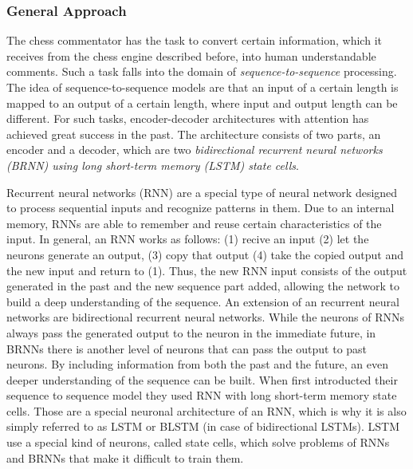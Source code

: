 \subsubsection{General Approach}

The chess commentator has the task to convert certain information, which it receives from the chess engine described before, into human understandable comments. Such a task falls into the domain of \textit{sequence-to-sequence} processing. The idea of sequence-to-sequence models are that an input of a certain length is mapped to an output of a certain length, where input and output length can be different. For such tasks, encoder-decoder architectures with attention has achieved great success in the past. The architecture consists of two parts, an encoder and a decoder, which are two \textit{bidirectional recurrent neural networks (BRNN) using long short-term memory (LSTM) state cells}.

Recurrent neural networks (RNN) are a special type of neural network designed to process sequential inputs and recognize patterns in them. Due to an internal memory, RNNs are able to remember and reuse certain characteristics of the input. In general, an RNN works as follows: (1) recive an input (2) let the neurons generate an output, (3) copy that output (4) take the copied output and the new input and return to (1). Thus, the new RNN input consists of the output generated in the past and the new sequence part added, allowing the network to build a deep understanding of the sequence. An extension of an recurrent neural networks are bidirectional recurrent neural networks. While the neurons of RNNs always pass the generated output to the neuron in the immediate future, in BRNNs there is another level of neurons that can pass the output to past neurons. By including information from both the past and the future, an even deeper understanding of the sequence can be built. When \cite{Sutskever-2014-sts} first introducted their sequence to sequence model they used RNN with long short-term memory state cells. Those are a special neuronal architecture of an RNN, which is why it is also simply referred to as LSTM or BLSTM (in case of bidirectional LSTMs). LSTM use a special kind of neurons, called state cells, which solve problems of RNNs and BRNNs that make it difficult to train them.

